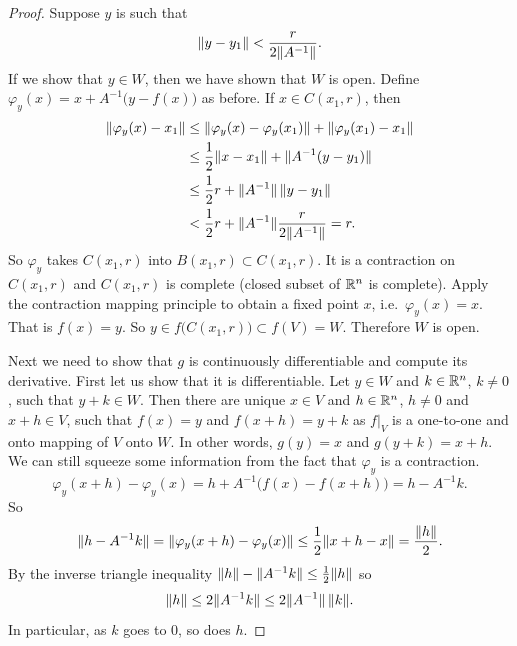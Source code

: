 \begin{proof}
Suppose $y$ is such that
\begin{equation*}
\lVert {y-y_1} \rVert <
\frac{r}{2\lVert {A^{-1}} \rVert} .
\end{equation*}
If we show that $y \in W$, then we have shown that $W$ is open.
Define $\varphi_y(x) = x+A^{-1}\bigl(y-f(x)\bigr)$ as before.  If $x \in
C(x_1,r)$, then
\begin{equation*}
\begin{split}
\lVert {\varphi_y(x)-x_1} \rVert
& \leq
\lVert {\varphi_y(x)-\varphi_y(x_1)} \rVert +
\lVert {\varphi_y(x_1)-x_1} \rVert \\
& \leq
\frac{1}{2}\lVert {x-x_1} \rVert +
\lVert {A^{-1}(y-y_1)} \rVert \\
& \leq
\frac{1}{2}r +
\lVert {A^{-1}} \rVert \, \lVert {y-y_1} \rVert \\
& <
\frac{1}{2}r +
\lVert {A^{-1}} \rVert
\frac{r}{2\lVert {A^{-1}} \rVert} = r .
\end{split}
\end{equation*}
So $\varphi_y$ takes $C(x_1,r)$ into $B(x_1,r) \subset C(x_1,r)$.  It is a
contraction on $C(x_1,r)$ and $C(x_1,r)$ is complete (closed subset of ${\mathbb{R}}^n$
is complete).
Apply the contraction mapping principle to obtain a fixed point $x$,
i.e.\ $\varphi_y(x) = x$.  That is $f(x) = y$.  So $y \in
f\bigl(C(x_1,r)\bigr) \subset f(V) = W$.  Therefore $W$ is open.

Next we need to show that $g$ is continuously differentiable and compute
its derivative.  First let us show that it is differentiable.
Let $y \in W$ and $k \in {\mathbb{R}}^n$, $k\not= 0$, such that $y+k \in W$.  Then
there are unique
$x \in V$ and $h \in {\mathbb{R}}^n$, $h \not= 0$ and $x+h \in V$, such that
$f(x) = y$ and $f(x+h) = y+k$ as $f|_V$ is a one-to-one and onto mapping of $V$
onto $W$.  In other words, $g(y) = x$ and $g(y+k) = x+h$.  We can still
squeeze some information from the fact that $\varphi_y$ is a contraction.
\begin{equation*}
\varphi_y(x+h)-\varphi_y(x) = h + A^{-1} \bigl( f(x)-f(x+h) \bigr) = h - A^{-1} k .
\end{equation*}
So
\begin{equation*}
\lVert {h-A^{-1}k} \rVert = \lVert {\varphi_y(x+h)-\varphi_y(x)} \rVert \leq
\frac{1}{2}\lVert {x+h-x} \rVert = \frac{\lVert {h} \rVert}{2}.
\end{equation*}
By the inverse triangle inequality $\lVert {h} \rVert - \lVert {A^{-1}k} \rVert \leq
\frac{1}{2}\lVert {h} \rVert$ so
\begin{equation*}
\lVert {h} \rVert \leq 2 \lVert {A^{-1}k} \rVert \leq 2 \lVert {A^{-1}} \rVert \, \lVert {k} \rVert.
\end{equation*}
In particular, as $k$ goes to 0, so does $h$.


\end{proof}
